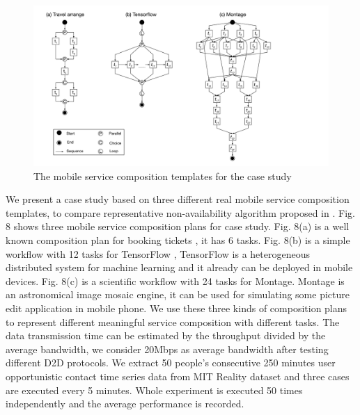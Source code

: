 \documentclass[journal]{IEEEtran}
\begin{document}
\begin{figure}[!t]
\centering
\includegraphics[width=5in]{./img/DAG.pdf}
\caption{The mobile service composition templates for the case study}
\label{DAG}
\end{figure}

We present a case study based on three different real mobile service composition templates, to compare representative non-availability algorithm proposed in \cite{Deng2017} \cite{sadiq2015service}. Fig. 8 shows three mobile service composition plans for case study. Fig. 8(a) is a well known composition plan for booking tickets \cite{wu2013transactional}, it has 6 tasks. Fig. 8(b) is a simple workflow with 12 tasks for TensorFlow \cite{abadi2016TensorFlow}, TensorFlow is a heterogeneous distributed system for machine learning and it already can be deployed in mobile devices. Fig. 8(c) is a scientific workflow with 24 tasks for Montage. Montage is an astronomical image mosaic engine, it can be used for simulating some picture edit application in mobile phone. We use these three kinds of composition plans to represent different meaningful service composition with different tasks. 
The data transmission time can be estimated by the throughput divided by the average bandwidth, we consider 20Mbps as average bandwidth after testing different D2D protocols. 
We extract 50 people's consecutive 250 minutes user opportunistic contact time series data from MIT Reality dataset and three cases are executed every 5 minutes. Whole experiment is executed 50 times independently and the average performance is recorded. 
\end{document}
